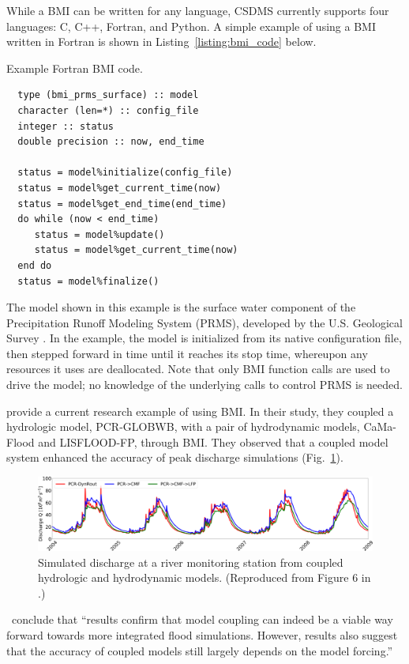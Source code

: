 \documentclass[journal abbreviation, manuscript]{copernicus}
\begin{document}
While a BMI can be written for any language,
CSDMS currently supports four languages: C, C++, Fortran, and Python.
A simple example of using a BMI written in Fortran
is shown in Listing~\ref{listing:bmi_code} below.
%
\begin{algorithm}
\caption{Example Fortran BMI code.}
\label{listing:bmi_code}
\begin{verbatim}
  type (bmi_prms_surface) :: model
  character (len=*) :: config_file
  integer :: status
  double precision :: now, end_time

  status = model%initialize(config_file)
  status = model%get_current_time(now)
  status = model%get_end_time(end_time)
  do while (now < end_time)
     status = model%update()
     status = model%get_current_time(now)
  end do
  status = model%finalize()
\end{verbatim}
\end{algorithm}
%
The model shown in this example
is the surface water component of the Precipitation Runoff Modeling System (PRMS),
developed by the U.S. Geological Survey \citep{leavesley1984precipitation}.
In the example,
the model is initialized from its native configuration file,
then stepped forward in time until it reaches its stop time,
whereupon any resources it uses are deallocated.
Note that only BMI function calls are used to drive the model;
no knowledge of the underlying calls to control PRMS is needed.

\cite{hoch2019evaluating} provide a current research example of using BMI. 
In their study,
they coupled a hydrologic model, PCR-GLOBWB,
with a pair of hydrodynamic models, CaMa-Flood and LISFLOOD-FP,
through BMI.
They observed that a coupled model system
enhanced the accuracy of peak discharge simulations (Fig.~\ref{fig:hoch_2019_fig6}).
%
\begin{figure}[h!]
\centering
\includegraphics[scale=0.8]{Figures/fig05.png}
\caption{Simulated discharge at a river monitoring station from coupled hydrologic and hydrodynamic models. (Reproduced from Figure 6 in \citet{hoch2019evaluating}.)}
\label{fig:hoch_2019_fig6}
\end{figure}
%
\citeauthor{hoch2019evaluating}\ conclude
that ``results confirm that model coupling can indeed be a viable way forward towards more integrated flood simulations. However, results also suggest that the accuracy of coupled models still largely depends on the model forcing.''
\end{document}
